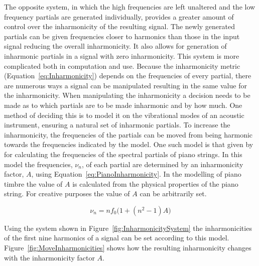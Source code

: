 		The opposite system, in which the high frequencies are left unaltered and the low frequency partials are
		generated individually, provides a greater amount of control over the inharmonicity of the resulting
		signal. The newly generated partials can be given frequencies closer to harmonics than those in the input
		signal reducing the overall inharmonicity. It also allows for generation of inharmonic partials in a signal
		with zero inharmonicity. This system is more complicated both in computation and use. Because the
		inharmonicity metric (Equation~\ref{eq:Inharmonicity}) depends on the frequencies of every partial, there
		are numerous ways a signal can be manipulated resulting in the same value for the inharmonicity. When
		manipulating the inharmonicity a decision needs to be made as to which partials are to be made inharmonic
		and by how much. One method of deciding this is to model it on the vibrational modes of an acoustic
		instrument, ensuring a natural set of inharmonic partials. To increase the inharmonicity, the frequencies
		of the partials can be moved from being harmonic towards the frequencies indicated by the model. One such
		model is that given by \citet{rossing2002the} for calculating the frequencies of the spectral partials of
		piano strings. In this model the frequencies, $\nu_{n}$, of each partial are determined by an inharmonicity
		factor, $A$, using Equation~\ref{eq:PianoInharmonicity}. In the modelling of piano timbre the value of $A$
		is calculated from the physical properties of the piano string. For creative purposes the value of $A$ can
		be arbitrarily set.

		\begin{equation}
			\nu_{n} = nf_{0} \bigl( 1 + \left( n^{2} - 1 \right) A \bigr)
			\label{eq:PianoInharmonicity}
		\end{equation}

		Using the system shown in Figure~\ref{fig:InharmonicitySystem} the inharmonicities of the first nine
		harmonics of a signal can be set according to this model. Figure~\ref{fig:MoveInharmonicities} shows how
		the resulting inharmonicity changes with the inharmonicity factor $A$.

